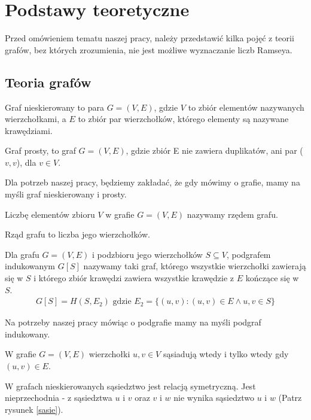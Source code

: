 \chapter{Podstawy teoretyczne} 
Przed omówieniem tematu naszej pracy, należy przedstawić kilka pojęć z teorii grafów, bez których zrozumienia, nie jest możliwe wyznaczanie liczb Ramseya.

  \section{Teoria grafów}
  \begin{definition}
    Graf nieskierowany to para $G=(V, E)$, gdzie $V$ to zbiór elementów nazywanych wierzchołkami, a $E$ to zbiór par wierzchołków, którego elementy są nazywane krawędziami.
  \end{definition}

  \begin{definition}
    Graf prosty, to graf $G=(V,E)$, gdzie zbiór E nie zawiera duplikatów, ani par ($v,v$), dla $v\in V$.
  \end{definition}

  Dla potrzeb naszej pracy, będziemy zakładać, że gdy mówimy o grafie, mamy na myśli graf nieskierowany i prosty.
  
  \begin{definition}
    Liczbę elementów zbioru $V$ w grafie $G=(V, E)$ nazywamy rzędem grafu. 
  \end{definition}

  Rząd grafu to liczba jego wierzchołków. 
  
       \begin{definition}
       Dla grafu $G=(V,E)$ i podzbioru jego wierzchołków $S \subseteq V$, 
       podgrafem indukowanym $G[S]$ nazywamy taki graf, którego wszystkie wierzchołki
       zawierają się w $S$ i którego zbiór krawędzi zawiera wszystkie krawędzie z $E$ kończące się w $S$. 
       \begin{align*}
       G[S] = H(S, E_2) \textrm{ gdzie }  E_2=\{(u,v):(u,v) \in E \wedge u,v \in S\}
       \end{align*}
     \end{definition}

     Na potrzeby naszej pracy mówiąc o podgrafie mamy na myśli podgraf indukowany.

  \begin{definition}[Sąsiedztwo]
    W grafie $G=(V, E)$ wierzchołki $u, v \in V$ sąsiadują wtedy i tylko wtedy gdy $(u, v) \in E$.    
  \end{definition}
  W grafach nieskierowanych sąsiedztwo jest relacją symetryczną. Jest nieprzechodnia - z sąsiedztwa $u$ i $v$ oraz $v$ i $w$ nie wynika sąsiedztwo $u$ i $w$ (Patrz rysunek \ref{sasie}).


